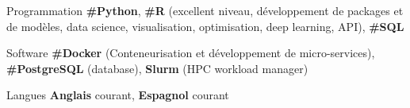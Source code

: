

\begin{cvskills}
  \cvskill
    {Programmation} %
    {\textbf{\#Python}, \textbf{\#R} (excellent niveau, développement de packages et de modèles, data science, visualisation, optimisation, deep learning, API), \textbf{\#SQL}} %

  \cvskill
    {Software} %
    {\textbf{\#Docker} (Conteneurisation et développement de micro-services), \textbf{\#PostgreSQL} (database), \textbf{Slurm} (HPC workload manager)} %

  \cvskill
  {Langues}
  {\textbf{Anglais} courant, \textbf{Espagnol} courant}
  
\end{cvskills}
